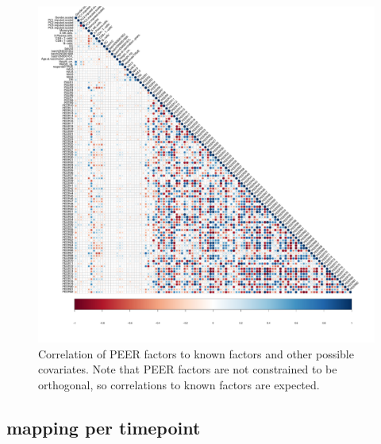 \begin{figure}
    \centering
    \includegraphics[width=1.0\textwidth,page=1]{mainmatter/figures/chapter_03/peer_mega/peer.factor_cor_matrix.v2.pdf}
    \caption{Correlation of PEER factors to known factors and other possible covariates. Note that PEER factors are not constrained to be orthogonal, so correlations to known factors are expected.}
    \label{fig:hird_peer_corMatrix_v2_mega}
\end{figure}

\subsection{ mapping per timepoint}

